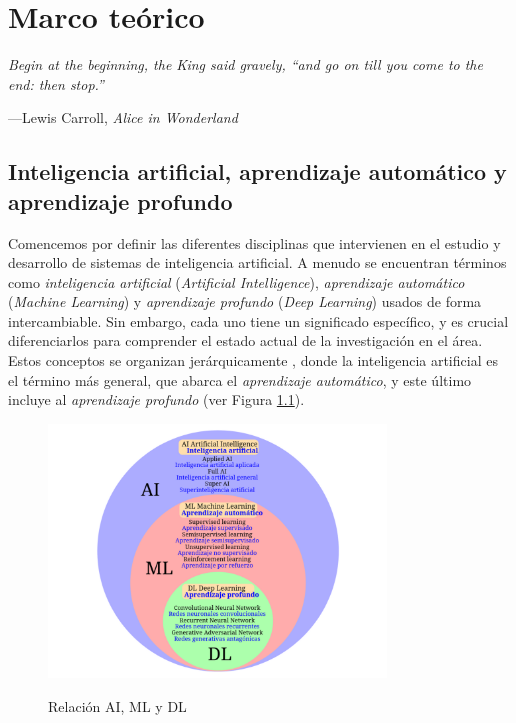 \chapter{Marco teórico}
\epigraph{\itshape Begin at the beginning, the King said gravely, ``and go on till you come to the end: then stop.''}{---Lewis Carroll, \textit{Alice in Wonderland}}
\section{Inteligencia artificial, aprendizaje automático y aprendizaje profundo}
Comencemos por definir las diferentes disciplinas que intervienen en el estudio y desarrollo de sistemas de inteligencia artificial. A menudo se encuentran términos como \textit{inteligencia artificial} (\textit{Artificial Intelligence}), \textit{aprendizaje automático} (\textit{Machine Learning}) y \textit{aprendizaje profundo} (\textit{Deep Learning}) usados de forma intercambiable. Sin embargo, cada uno tiene un significado específico, y es crucial diferenciarlos para comprender el estado actual de la investigación en el área. Estos conceptos se organizan jerárquicamente \citep{torresivinalsPythonDeepLearning2020}, donde la inteligencia artificial es el término más general, que abarca el \textit{aprendizaje automático}, y este último incluye al \textit{aprendizaje profundo} (ver Figura \ref{fig:ai_ml_dl}).

\begin{figure}[h]
    \caption{Relación AI, ML y DL}
    \centering
    \includegraphics[width=0.8\textwidth]{./figuras/AI_ML_DL.png}
    \label{fig:ai_ml_dl}
\end{figure}

